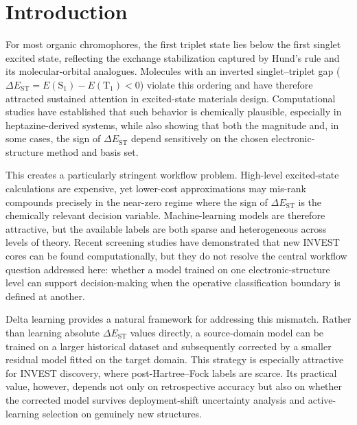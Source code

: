 \documentclass[journal=jcisd8,manuscript=article]{achemso}
\begin{document}
\section{Introduction}

For most organic chromophores, the first triplet state lies below the first singlet excited state, reflecting the exchange stabilization captured by Hund's rule and its molecular-orbital analogues.\cite{Hund1925,Kutzelnigg1996} Molecules with an inverted singlet--triplet gap ($\Delta E_\mathrm{ST}=E(\mathrm{S}_1)-E(\mathrm{T}_1)<0$) violate this ordering and have therefore attracted sustained attention in excited-state materials design.\cite{Ehrmaier2019,deSilva2019,Ricci2021} Computational studies have established that such behavior is chemically plausible, especially in heptazine-derived systems, while also showing that both the magnitude and, in some cases, the sign of $\Delta E_\mathrm{ST}$ depend sensitively on the chosen electronic-structure method and basis set.\cite{Pollice2021,Loos2021,Loos2023}

This creates a particularly stringent workflow problem. High-level excited-state calculations are expensive, yet lower-cost approximations may mis-rank compounds precisely in the near-zero regime where the sign of $\Delta E_\mathrm{ST}$ is the chemically relevant decision variable. Machine-learning models are therefore attractive, but the available labels are both sparse and heterogeneous across levels of theory. Recent screening studies have demonstrated that new INVEST cores can be found computationally,\cite{Omar2023,SanzRodrigo2024} but they do not resolve the central workflow question addressed here: whether a model trained on one electronic-structure level can support decision-making when the operative classification boundary is defined at another.

Delta learning provides a natural framework for addressing this mismatch. Rather than learning absolute $\Delta E_\mathrm{ST}$ values directly, a source-domain model can be trained on a larger historical dataset and subsequently corrected by a smaller residual model fitted on the target domain.\cite{Ramakrishnan2015,Smith2019,Dral2020} This strategy is especially attractive for INVEST discovery, where post-Hartree--Fock labels are scarce. Its practical value, however, depends not only on retrospective accuracy but also on whether the corrected model survives deployment-shift uncertainty analysis and active-learning selection on genuinely new structures.\cite{Musil2019}
\end{document}
